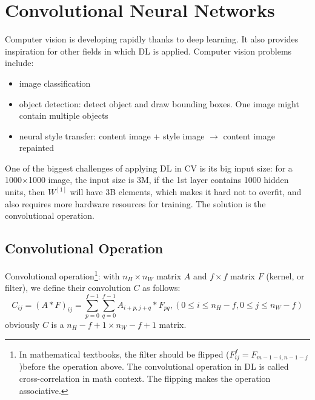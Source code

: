 \ifx\PREAMBLE\undefined


\fi
\chapter{Convolutional Neural Networks}
Computer vision is developing rapidly thanks to deep learning. It also provides inspiration for other fields in which DL is applied. Computer vision problems include: 
\begin{itemize}
  \item image classification
  \item object detection: detect object and draw bounding boxes. One image might contain multiple objects
  \item neural style transfer: content image + style image $\rightarrow$ content image repainted
\end{itemize}
One of the biggest challenges of applying DL in CV is its big input size: for a 1000$\times$1000 image, the input size is 3M, if the 1st layer contains 1000 hidden units, then $W^{[1]}$ will have 3B elements, which makes it hard not to overfit, and also requires more hardware resources for training. The solution is the convolutional operation.
\section{Convolutional Operation}
Convolutional operation\footnote{In mathematical textbooks, the filter should be flipped ($F^f_{ij}=F_{m-1-i, n-1-j}$)before the operation above. The convolutional operation in DL is called cross-correlation in math context. The flipping makes the operation associative.}: with $n_H\times n_W$ matrix $A$ and $f\times f$ matrix $F$ (kernel, or filter), we define their convolution $C$ as follows:
    \[C_{ij}=\left(A*F\right)_{ij}=\displaystyle\sum_{p=0}^{f-1}\displaystyle\sum_{q=0}^{f-1}A_{i+p,j+q}*F_{pq}, \left(0\le i\le n_H-f, 0\le j\le n_W-f\right)\]
obviously $C$ is a $n_H-f+1\times n_W-f+1$ matrix.
